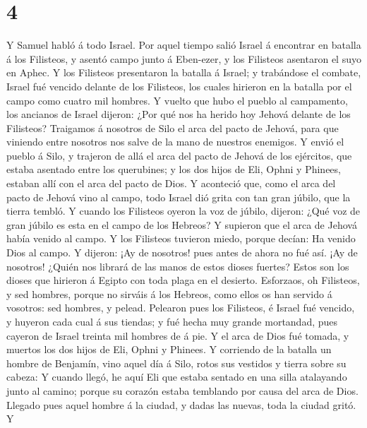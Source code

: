 \hypertarget{section-3}{%
\section{4}\label{section-3}}

 Y Samuel habló á todo Israel. Por aquel tiempo salió
Israel á encontrar en batalla á los Filisteos, y asentó campo junto á
Eben-ezer, y los Filisteos asentaron el suyo en Aphec.  Y
los Filisteos presentaron la batalla á Israel; y trabándose el combate,
Israel fué vencido delante de los Filisteos, los cuales hirieron en la
batalla por el campo como cuatro mil hombres.  Y vuelto
que hubo el pueblo al campamento, los ancianos de Israel dijeron: ¿Por
qué nos ha herido hoy Jehová delante de los Filisteos? Traigamos á
nosotros de Silo el arca del pacto de Jehová, para que viniendo entre
nosotros nos salve de la mano de nuestros enemigos.  Y
envió el pueblo á Silo, y trajeron de allá el arca del pacto de Jehová
de los ejércitos, que estaba asentado entre los querubines; y los dos
hijos de Eli, Ophni y Phinees, estaban allí con el arca del pacto de
Dios.  Y aconteció que, como el arca del pacto de Jehová
vino al campo, todo Israel dió grita con tan gran júbilo, que la tierra
tembló.  Y cuando los Filisteos oyeron la voz de júbilo,
dijeron: ¿Qué voz de gran júbilo es esta en el campo de los Hebreos? Y
supieron que el arca de Jehová había venido al campo.  Y
los Filisteos tuvieron miedo, porque decían: Ha venido Dios al campo. Y
dijeron: ¡Ay de nosotros! pues antes de ahora no fué así. 
¡Ay de nosotros! ¿Quién nos librará de las manos de estos dioses
fuertes? Estos son los dioses que hirieron á Egipto con toda plaga en el
desierto.  Esforzaos, oh Filisteos, y sed hombres, porque
no sirváis á los Hebreos, como ellos os han servido á vosotros: sed
hombres, y pelead.  Pelearon pues los Filisteos, é Israel
fué vencido, y huyeron cada cual á sus tiendas; y fué hecha muy grande
mortandad, pues cayeron de Israel treinta mil hombres de á pie.
 Y el arca de Dios fué tomada, y muertos los dos hijos de
Eli, Ophni y Phinees.  Y corriendo de la batalla un
hombre de Benjamín, vino aquel día á Silo, rotos sus vestidos y tierra
sobre su cabeza:  Y cuando llegó, he aquí Eli que estaba
sentado en una silla atalayando junto al camino; porque su corazón
estaba temblando por causa del arca de Dios. Llegado pues aquel hombre á
la ciudad, y dadas las nuevas, toda la ciudad gritó.  Y
